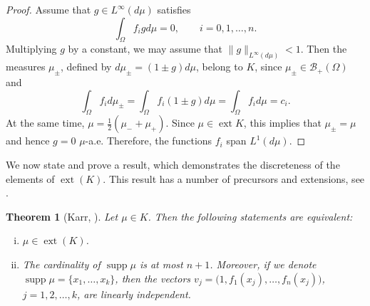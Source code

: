 \documentclass[11pt, leqno]{amsart}
\def\ext{\operatorname{ext}}
\def\supp{\operatorname{supp}}
\newtheorem{theorem}{Theorem}[section]
\theoremstyle{definition}
\numberwithin{equation}{section}
\begin{document}
 
 \begin{proof}
 Assume that $g\in L^\infty (d\mu )$ satisfies $$ \int_\Omega f_i g  d\mu = 0, \qquad i=0,1,\dots,n. $$
 Multiplying $g$ by a constant, we may assume that $\| g \|_{L^\infty (d\mu )} < 1$. Then the measures $\mu_\pm$,  defined by  $d\mu_{\pm} = (1\pm g)  d\mu$,  belong to $K$, since $\mu_\pm \in \mathcal B_+ (\Omega)$ and  $$ \int _\Omega  f_i d\mu_\pm = \int_\Omega f_i (1 \pm g) d\mu =  \int_\Omega f_i  d\mu = c_i. $$
 At the same time, $\mu = \frac12 (\mu_-+\mu_+)$. Since $\mu \in \ext K$, this implies that $\mu_\pm = \mu$ and hence $g=0$ $\mu$-a.e. Therefore, the functions $f_i$ span $L^1 (d\mu)$. 
 \end{proof}


We now state and prove a result, which demonstrates the discreteness of the elements of $\ext (K)$. This result has a number of precursors and extensions, see \cite{Richter,rogo1,rogo,rose,winkler,zuhov}.


\begin{theorem}[Karr, \cite{karrExtr1983}]\label{thm:karr}
Let $\mu \in K$. Then the following statements are equivalent:
\begin{enumerate}[(i)]
\item\label{G1} $\mu \in \ext (K)$.
\item\label{G2}  The cardinality of $\supp \mu$ is at most $n+1$. Moreover,  if we denote $\supp \mu = \{x_1, \dots, x_k \}$, then the vectors $v_j =  \big(  1, f_1 (x_j), \dots, f_n (x_j) \big)$, $j=1,2,\dots, k$, are linearly independent. 
\end{enumerate}
\end{theorem} 
\end{document}
